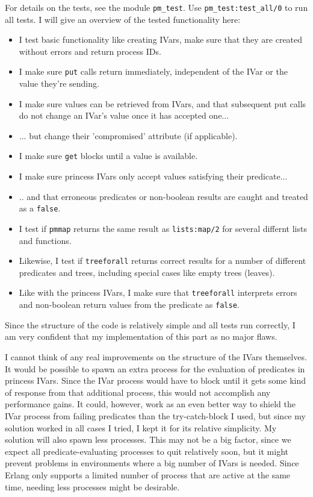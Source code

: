 \documentclass[a4paper]{article}
\begin{document}
For details on the tests, see the module \texttt{pm\_test}. Use \texttt{pm\_test:test\_all/0} to run all tests. I will give an overview of the tested functionality here:
\begin{itemize}
  \item I test basic functionality like creating IVars, make sure that they are created without errors and return process IDs.
  \item I make sure \texttt{put} calls return immediately, independent of the IVar or the value they're sending.
  \item I make sure values can be retrieved from IVars, and that subsequent put calls do not change an IVar's value once it has accepted one...
  \item ... but change their 'compromised' attribute (if applicable).
  \item I make sure \texttt{get} blocks until a value is available.
  \item I make sure princess IVars only accept values satisfying their predicate...
  \item .. and that erroneous predicates or non-boolean results are caught and treated as a \texttt{false}.
  \item I test if \texttt{pmmap} returns the same result as \texttt{lists:map/2} for several differnt lists and functions.
  \item Likewise, I test if \texttt{treeforall} returns correct results for a number of different predicates and trees, including special cases like empty trees (leaves). 
  \item Like with the princess IVars, I make sure that \texttt{treeforall} interprets errors and non-boolean return values from the predicate as \texttt{false}.
\end{itemize}

Since the structure of the code is relatively simple and all tests run correctly, I am very confident that my implementation of this part as no major flaws.

I cannot think of any real improvements on the structure of the IVars themselves. It would be possible to spawn an extra process for the evaluation of predicates in princess IVars. Since the IVar process would have to block until it gets some kind of response from that additional process, this would not accomplish any performance gains. It could, however, work as an even better way to shield the IVar process from failing predicates than the try-catch-block I used, but since my solution worked in all cases I tried, I kept it for its relative simplicity. My solution will also spawn less processes. This may not be a big factor, since we expect all predicate-evaluating processes to quit relatively soon, but it might prevent problems in environments where a big number of IVars is needed. Since Erlang only supports a limited number of process that are active at the same time, needing less processes might be desirable.
\end{document}
